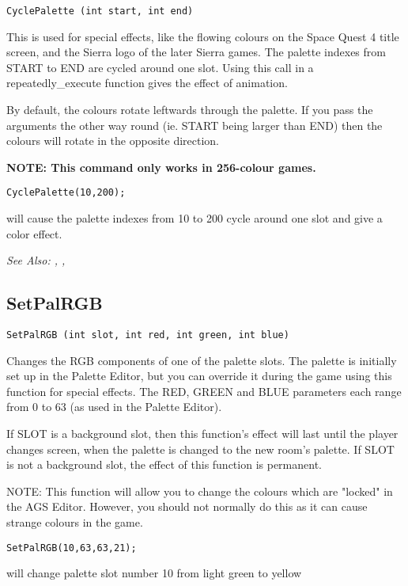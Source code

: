 \begin{verbatim}
CyclePalette (int start, int end)
\end{verbatim}
This is used for special effects, like the flowing colours on the Space
Quest 4 title screen, and the Sierra logo of the later Sierra games.
The palette indexes from START to END are cycled around one slot. Using
this call in a repeatedly_execute function gives the effect of animation.

By default, the colours rotate leftwards through the palette. If you pass
the arguments the other way round (ie. START being larger than END) then
the colours will rotate in the opposite direction.

\bf{NOTE:} This command only works in 256-colour games.

\begin{verbatim}
CyclePalette(10,200);
\end{verbatim}
will cause the palette indexes from 10 to 200 cycle around one slot and give a color effect.

\it{See Also:} , , 


\subsection{SetPalRGB}\label{SetPalRGB}%

\begin{verbatim}
SetPalRGB (int slot, int red, int green, int blue)
\end{verbatim}
Changes the RGB components of one of the palette slots. The palette is
initially set up in the Palette Editor, but you can override it during the game using
this function for special effects. The RED, GREEN and BLUE parameters each
range from 0 to 63 (as used in the Palette Editor).

If SLOT is a background slot, then this function's effect will last until
the player changes screen, when the palette is changed to the new room's
palette. If SLOT is not a background slot, the effect of this function is
permanent.

NOTE: This function will allow you to change the colours which are "locked"
in the AGS Editor. However, you should not normally do this as it can
cause strange colours in the game.

\begin{verbatim}
SetPalRGB(10,63,63,21);
\end{verbatim}
will change palette slot number 10 from light green to yellow

